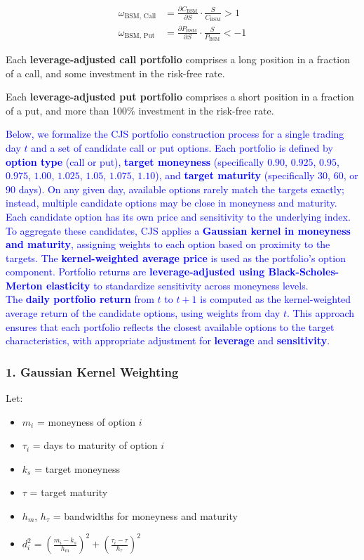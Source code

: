 \documentclass{article}
\begin{document}
\begin{appendices}
\begin{align}
\omega_{\text{BSM, Call}} &= \frac{\partial C_{\text{BSM}}}{\partial S} \cdot \frac{S}{C_{\text{BSM}}} > 1 \\
\omega_{\text{BSM, Put}}  &= \frac{\partial P_{\text{BSM}}}{\partial S} \cdot \frac{S}{P_{\text{BSM}}} < -1
\end{align}

Each \textbf{leverage-adjusted call portfolio} comprises a long position in a fraction of a call, and some investment in the risk-free rate.

Each \textbf{leverage-adjusted put portfolio} comprises a short position in a fraction of a put, and more than 100\% investment in the risk-free rate.

\textcolor{blue}{
Below, we formalize the CJS portfolio construction process for a single trading day $t$ and a set of candidate call or put options. Each portfolio is defined by \textbf{option type} (call or put), \textbf{target moneyness} (specifically $0.90$, $0.925$, $0.95$, $0.975$, $1.00$, $1.025$, $1.05$, $1.075$, $1.10$), and \textbf{target maturity} (specifically $30$, $60$, or $90$ days). On any given day, available options rarely match the targets exactly; instead, multiple candidate options may be close in moneyness and maturity. Each candidate option has its own price and sensitivity to the underlying index. \\ To aggregate these candidates, CJS applies a \textbf{Gaussian kernel in moneyness and maturity}, assigning weights to each option based on proximity to the targets. The \textbf{kernel-weighted average price} is used as the portfolio's option component. Portfolio returns are \textbf{leverage-adjusted using Black-Scholes-Merton elasticity} to standardize sensitivity across moneyness levels. \\ The \textbf{daily portfolio return} from $t$ to $t+1$ is computed as the kernel-weighted average return of the candidate options, using weights from day $t$. This approach ensures that each portfolio reflects the closest available options to the target characteristics, with appropriate adjustment for \textbf{leverage} and \textbf{sensitivity}.}

\subsubsection*{1. Gaussian Kernel Weighting}

Let:
\begin{itemize}
  \item $m_{i}$ = moneyness of option $i$
  \item $\tau_{i}$ = days to maturity of option $i$
  \item $k_{s}$ = target moneyness
  \item $\tau$ = target maturity
  \item $h_{m}$, $h_{\tau}$ = bandwidths for moneyness and maturity
  \item $d_{i}^2 = \left( \frac{m_{i} - k_{s}}{h_{m}} \right)^2 + \left( \frac{\tau_{i} - \tau}{h_{\tau}} \right)^2$
\end{itemize}


\end{appendices}
\end{document}
